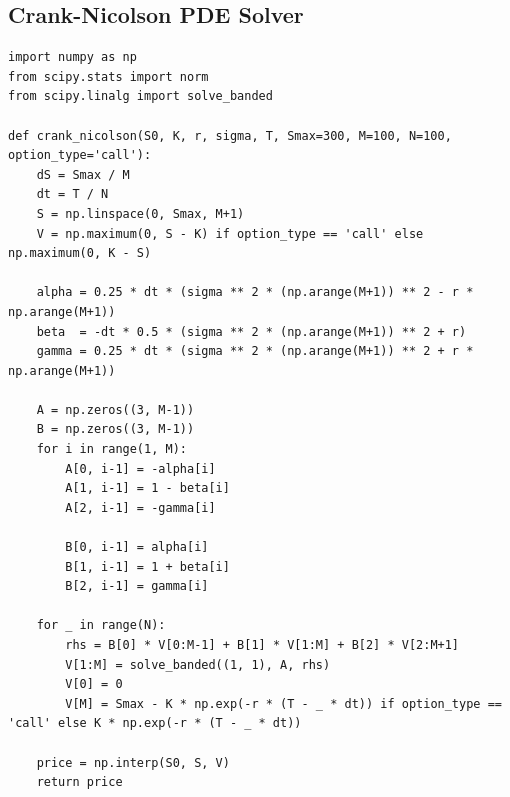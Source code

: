 \documentclass[12pt,a4paper]{article}
\begin{document}
\vspace{1em}

\subsection{Crank-Nicolson PDE Solver}
\begin{lstlisting}
import numpy as np
from scipy.stats import norm
from scipy.linalg import solve_banded

def crank_nicolson(S0, K, r, sigma, T, Smax=300, M=100, N=100, option_type='call'):
    dS = Smax / M
    dt = T / N
    S = np.linspace(0, Smax, M+1)
    V = np.maximum(0, S - K) if option_type == 'call' else np.maximum(0, K - S)

    alpha = 0.25 * dt * (sigma ** 2 * (np.arange(M+1)) ** 2 - r * np.arange(M+1))
    beta  = -dt * 0.5 * (sigma ** 2 * (np.arange(M+1)) ** 2 + r)
    gamma = 0.25 * dt * (sigma ** 2 * (np.arange(M+1)) ** 2 + r * np.arange(M+1))

    A = np.zeros((3, M-1))
    B = np.zeros((3, M-1))
    for i in range(1, M):
        A[0, i-1] = -alpha[i]
        A[1, i-1] = 1 - beta[i]
        A[2, i-1] = -gamma[i]

        B[0, i-1] = alpha[i]
        B[1, i-1] = 1 + beta[i]
        B[2, i-1] = gamma[i]

    for _ in range(N):
        rhs = B[0] * V[0:M-1] + B[1] * V[1:M] + B[2] * V[2:M+1]
        V[1:M] = solve_banded((1, 1), A, rhs)
        V[0] = 0
        V[M] = Smax - K * np.exp(-r * (T - _ * dt)) if option_type == 'call' else K * np.exp(-r * (T - _ * dt))

    price = np.interp(S0, S, V)
    return price
\end{lstlisting}
\end{document}

